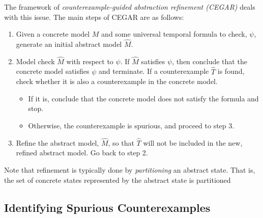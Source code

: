 \documentclass[10pt,a4paper]{article}
\begin{document}
The framework of \textit{counterexample-guided abstraction refinement (CEGAR)} deals with this issue. The main steps of CEGAR are as follows:
\begin{enumerate}
    \item Given a concrete model $M$ and some universal temporal formula to check, $\psi$, generate an initial abstract model $\widehat{M}$.
    \item Model check $\widehat{M}$ with respect to $\psi$. If $\widehat{M}$ satisfies $\psi$, then conclude that the concrete model satisfies $\psi$ and terminate. If a counterexample $\widehat{T}$ is found, check whether it is also a counterexample in the concrete model. 
    
    \begin{itemize}
        \item If it is, conclude that the concrete model does not satisfy the formula and stop.
        \item Otherwise, the counterexample is spurious, and proceed to step 3.
    \end{itemize}
    \item Refine the abstract model, $\widehat{M}$, so that $\widehat{T}$ will not be included in the new, refined abstract model. Go back to step 2.
\end{enumerate}

Note that refinement is typically done by \textit{partitioning} an abstract state. That is, the set of concrete states represented by the abstract state is partitioned

\subsection*{Identifying Spurious Counterexamples}
\end{document}
